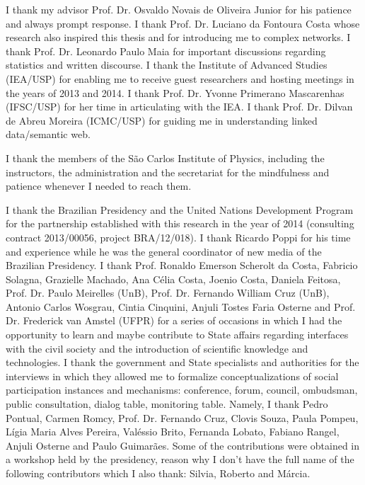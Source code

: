 \documentclass[
12pt,		%
openright,	%
twoside,  %
a4paper,			%
chapter=TITLE,		%
english,			%
french,				%
spanish,			%
brazil				%
]{USPSC}
\begin{document}
\begin{agradecimentos}
I thank my advisor
Prof. Dr. Osvaldo Novais de Oliveira Junior
for his patience and always prompt response.	
I thank Prof. Dr. Luciano da Fontoura Costa
whose research also inspired this thesis
and for introducing me to complex networks.
I thank Prof. Dr. Leonardo Paulo Maia for important discussions regarding statistics and
written discourse.
I thank the Institute of Advanced Studies (IEA/USP)
for enabling me to receive guest researchers and hosting meetings in the years of 2013 and 2014.
I thank Prof. Dr. Yvonne Primerano Mascarenhas (IFSC/USP) for her time in articulating with the IEA.
I thank Prof. Dr. Dilvan de Abreu Moreira (ICMC/USP) for guiding me in understanding linked data/semantic web.

I thank the members of the São Carlos Institute of Physics,
including the instructors, the administration and the secretariat
for the mindfulness and patience whenever I needed to reach them.

I thank the Brazilian Presidency and the United Nations Development Program for
the partnership established with this research in the year of 2014 (consulting contract 2013/00056, project BRA/12/018).
I thank Ricardo Poppi for his time and experience while he was the general coordinator of new media of the Brazilian Presidency.
I thank Prof. Ronaldo Emerson Scherolt da Costa, Fabricio Solagna, Grazielle Machado, Ana Célia Costa,
	Joenio Costa, Daniela Feitosa, Prof. Dr. Paulo Meirelles (UnB), Prof. Dr. Fernando William Cruz (UnB), Antonio Carlos Wosgrau,
	Cintia Cinquini, Anjuli Tostes Faria Osterne and Prof. Dr. Frederick van Amstel (UFPR) for
a series of occasions in which I had the opportunity to learn and maybe contribute to State affairs
regarding interfaces with the civil society and the introduction of scientific knowledge and technologies.
I thank the government and State specialists and authorities for the interviews in which they
allowed me to formalize conceptualizations of social participation instances and mechanisms:
conference, forum, council, ombudsman, public consultation, dialog table, monitoring table.
Namely, I thank Pedro Pontual, Carmen Romcy, Prof. Dr. Fernando Cruz, Clovis Souza, Paula Pompeu, Lígia Maria Alves Pereira,
Valéssio Brito, Fernanda Lobato, Fabiano Rangel, Anjuli Osterne and Paulo Guimarães.
Some of the contributions were obtained in a workshop held by the presidency,
reason why I don't have the full name of the following contributors
which I also thank: Silvia, Roberto and Márcia.


\end{agradecimentos}
\end{document}
